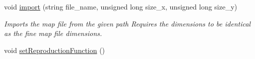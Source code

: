 \begin{DoxyCompactItemize}
\item 
void \hyperlink{class_reproduction_map_a144d2f39ff2e978acd9d2ebcb6f8dc97}{import} (string file\+\_\+name, unsigned long size\+\_\+x, unsigned long size\+\_\+y)
\begin{DoxyCompactList}\small\item\em Imports the map file from the given path Requires the dimensions to be identical as the fine map file dimensions. \end{DoxyCompactList}\item 
void \hyperlink{class_reproduction_map_afc0419bc78ce9a4813212360c67b49a2}{set\+Reproduction\+Function} ()\hypertarget{class_reproduction_map_afc0419bc78ce9a4813212360c67b49a2}{}\label{class_reproduction_map_afc0419bc78ce9a4813212360c67b49a2}


\end{DoxyCompactItemize}

